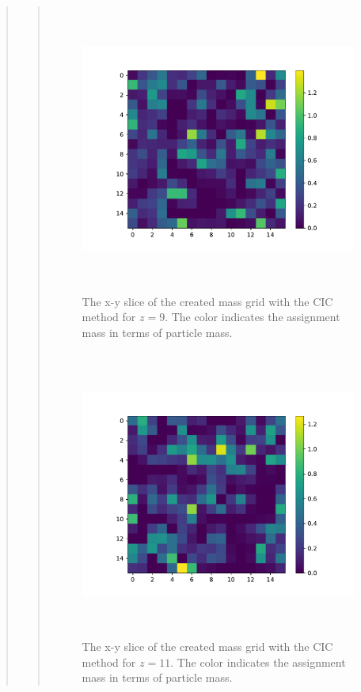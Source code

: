 \begin{quote}
\begin{quote}
\begin{figure}[!ht]
\centering
\includegraphics[width=14cm, height=9.5cm]{./Plots/5c_slice_9.pdf}
\caption{The x-y slice of the created mass grid with the CIC method for $z = 9$. The color indicates the assignment mass in terms of particle mass. }
\end{figure}

\newpage
\begin{figure}[!ht]
\centering
\includegraphics[width=14cm, height=9.5cm]{./Plots/5c_slice_11.pdf}
\caption{The x-y slice of the created mass grid with the CIC method for $z = 11$. The color indicates the assignment mass in terms of particle mass. }
\end{figure}



\end{quote}
\end{quote}
